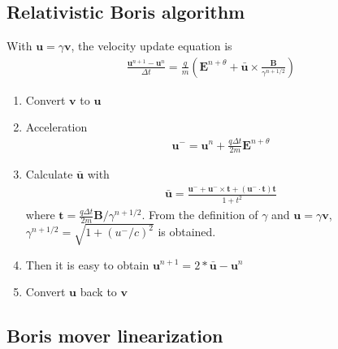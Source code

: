 \documentclass[a4paper, 11pt]{article}
\begin{document}
\subsection{Relativistic Boris algorithm}

With $\mathbf{u} = \gamma \mathbf{v}$, the velocity update equation is
\begin{eqnarray}
\frac{\mathbf{u}^{n+1} - \mathbf{u}^{n}}{\Delta t} = \frac{q}{m}(\mathbf{E}^{n+\theta} + \bar{\mathbf{u}}\times \frac{\mathbf{B}}{\gamma ^{n+1/2}})
\end{eqnarray}

\begin{enumerate}
    \item Convert $\mathbf{v}$ to $\mathbf{u}$
    \item Acceleration
\begin{eqnarray}
    \mathbf{u}^- = \mathbf{u}^{n} + \frac{q\Delta t}{2m}\mathbf{E}^{n+\theta}
\end{eqnarray}

\item Calculate $\bar{\mathbf{u}}$ with
\begin{eqnarray}
\bar{\mathbf{u}} = \frac{\mathbf{u}^- + \mathbf{u}^- \times \mathbf{t} + (\mathbf{u}^- \cdot \mathbf{t})\mathbf{t}}{1+t^2}
\end{eqnarray}
where $\mathbf{t} = \frac{q\Delta t}{2m} \mathbf{B}/\gamma^{n+1/2}$. From the definition of $\gamma$ and $\mathbf{u} = \gamma \mathbf{v}$, $\gamma ^{n+1/2} = \sqrt{1+(u^-/c)^2}$ is obtained. 

\item Then it is easy to obtain $\mathbf{u}^{n+1} = 2*\bar{\mathbf{u}} - \mathbf{u}^{n}$
\item  Convert $\mathbf{u}$ back to $\mathbf{v}$
\end{enumerate}

\subsection{Boris mover linearization}
\end{document}
